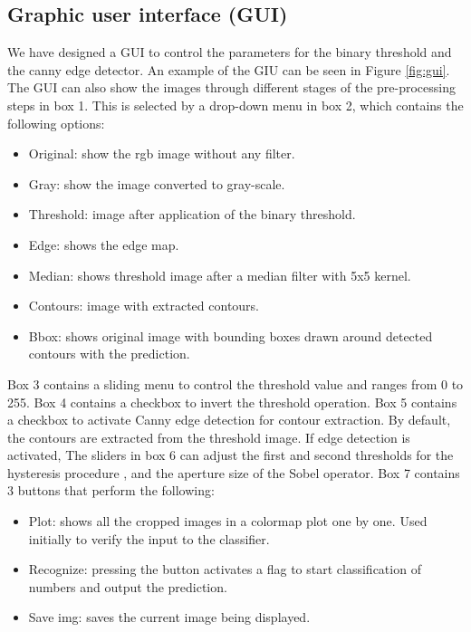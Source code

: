 \documentclass[12pt, letterpaper]{article}
\begin{document}
\subsection{Graphic user interface (GUI)}
	We have designed a GUI to control the parameters for the binary threshold and the canny edge detector. An example of the GIU can be seen in Figure \ref{fig:gui}. The GUI can also show the images through different stages of the pre-processing steps in box 1. This is selected by a drop-down menu in box 2, which contains the following options:
	\begin{itemize}
		\item Original: show the rgb image without any filter.
		\item Gray: show the image converted to gray-scale.
		\item Threshold: image after application of the binary threshold.
		\item Edge: shows the edge map.
		\item Median: shows threshold image after a median filter with 5x5 kernel.
		\item Contours: image with extracted contours.
		\item Bbox: shows original image with bounding boxes drawn around detected contours with the prediction.
	\end{itemize}
	Box 3 contains a sliding menu to control the threshold value and ranges from 0 to 255. Box 4 contains a checkbox to invert the threshold operation. Box 5 contains a checkbox to activate Canny edge detection for contour extraction. By default, the contours are extracted from the threshold image. If edge detection is activated, The sliders in box 6 can adjust the first and second thresholds for the hysteresis procedure , and the aperture size of the Sobel operator. Box 7 contains 3 buttons that perform the following:
	\begin{itemize}
		\item Plot: shows all the cropped images in a colormap plot one by one. Used initially to verify the input to the classifier.
		\item Recognize: pressing the button activates a flag to start classification of numbers and output the prediction.
		\item Save img: saves the current image being displayed.
	\end{itemize}
	
\end{document}
